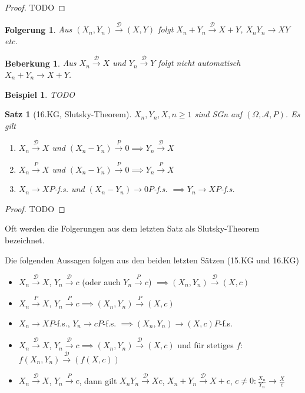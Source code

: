 \documentclass[]{article}
\newtheorem{theorem}{Satz}
\newtheorem*{corollary}{Folgerung}
\newtheorem*{remark}{Beberkung}
\newtheorem*{example}{Beispiel}
\begin{document}
\begin{proof}
	TODO
\end{proof}

\begin{corollary}
	Aus $(X_n, Y_n)\xrightarrow{\mathcal{D}} (X,Y)$ folgt $X_n+Y_n\xrightarrow{\mathcal{D}} X+Y$, $X_nY_n \rightarrow XY$ etc.
\end{corollary}

\begin{remark}
	Aus $X_n \xrightarrow{\mathcal{D}} X$ und $Y_n \xrightarrow{\mathcal{D}} Y$ folgt nicht automatisch $X_n + Y_n \rightarrow X+Y$.
\end{remark}

\begin{example}
	TODO
\end{example}

\begin{theorem}[16.KG, Slutsky-Theorem]
	$X_n, Y_n, X, n\geq 1$ sind SGn auf $(\Omega, \mathcal{A}, P)$. Es gilt
	\begin{enumerate}
		\item $X_n \xrightarrow{\mathcal{D}} X$ und $(X_n - Y_n)\xrightarrow{P} 0 \implies Y_n\xrightarrow{\mathcal{D}}X$
		\item $X_n \xrightarrow{P} X$ und $(X_n - Y_n)\xrightarrow{P} 0 \implies Y_n\xrightarrow{P}X$
		\item $X_n \rightarrow X P$-f.s. und $(X_n - Y_n)\rightarrow 0 P$-f.s. $\implies Y_n\rightarrow X P$-f.s.
	\end{enumerate}
\end{theorem}

\begin{proof}
	TODO
\end{proof}

Oft werden die Folgerungen aus dem letzten Satz als Slutsky-Theorem bezeichnet.

Die folgenden Aussagen folgen aus den beiden letzten Sätzen (15.KG und 16.KG)

\begin{itemize}
	\item $X_n \xrightarrow{\mathcal{D}} X$, $Y_n \xrightarrow{\mathcal{D}} c$ (oder auch $Y_n\xrightarrow{P} c$) $\implies (X_n, Y_n) \xrightarrow{\mathcal{D}} (X,c)$
	\item $X_n \xrightarrow{P} X$, $Y_n \xrightarrow{P} c \implies (X_n, Y_n) \xrightarrow{P} (X,c)$
	\item $X_n \rightarrow X P$-f.s., $Y_n \rightarrow c P$-f.s. $\implies (X_n, Y_n)\rightarrow (X, c) P$-f.s.
	\item $X_n \xrightarrow{\mathcal{D}} X$, $Y_n \xrightarrow{\mathcal{D}} c \implies (X_n, Y_n)\xrightarrow{\mathcal{D}} (X,c)$ und für stetiges $f$: $f(X_n, Y_n) \xrightarrow{\mathcal{D}} (f(X,c))$
	\item $X_n \xrightarrow{\mathcal{D}} X$, $Y_n \xrightarrow{P} c$, dann gilt $X_n Y_n \xrightarrow{\mathcal{D}} Xc$, $X_n + Y_n \xrightarrow{\mathcal{D}} X+c$, $c\neq 0: \frac{X_n}{Y_n} \rightarrow \frac{X}{c}$
\end{itemize}
\end{document}
